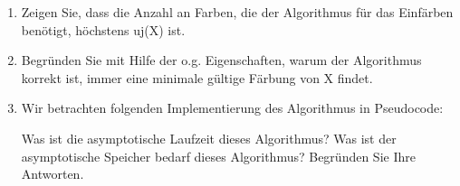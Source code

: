 \documentclass{bschlangaul-aufgabe}
\begin{document}
\begin{enumerate}

\item Zeigen Sie, dass die Anzahl an Farben, die der Algorithmus für das
Einfärben benötigt, höchstens uj(X) ist.


\item Begründen Sie mit Hilfe der o.g. Eigenschaften, warum der
Algorithmus korrekt ist, \dh immer eine minimale gültige Färbung von X
findet.


\item Wir betrachten folgenden Implementierung des Algorithmus in
Pseudocode:

















Was ist die asymptotische Laufzeit dieses Algorithmus? Was ist der
asymptotische Speicher bedarf dieses Algorithmus? Begründen Sie Ihre
Antworten.
\end{enumerate}
\end{document}

